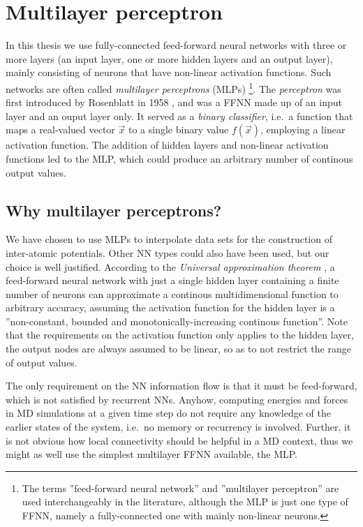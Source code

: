 \documentclass[twoside,english]{uiofysmaster}
\begin{document}
\section{Multilayer perceptron} \label{sec:MLP}
In this thesis we use fully-connected feed-forward neural networks with three
or more layers (an input layer, one or more hidden layers and an output layer), mainly
consisting of neurons that have non-linear activation functions.
Such networks are often called \textit{multilayer perceptrons} (MLPs)%
\footnote{The terms ''feed-forward neural network'' and ''multilayer perceptron'' are used interchangeably in the 
literature, although the MLP is just one type of FFNN, namely a fully-connected one with mainly non-linear neurons.}.
The \textit{perceptron} was first introduced by Rosenblatt in 1958 \cite{Rosenblatt58}, and was a FFNN made up of an input layer
and an ouput layer only. It served as a \textit{binary classifier}, i.e.\ a function that maps a real-valued vector $\vec{x}$ 
to a single binary value $f(\vec{x})$, employing a linear activation function. The addition of hidden layers and 
non-linear activation functions led to the MLP, which could produce an arbitrary number of continous output values. 

\subsection{Why multilayer perceptrons?} \label{sec:whyMLP}
We have chosen to use MLPs to interpolate data sets for the construction of inter-atomic potentials. 
Other NN types could also have been used, but our choice is well justified. According to the
\textit{Universal approximation theorem} \cite{Hornik89}, a feed-forward neural network with just a single hidden layer containing 
a finite number of neurons can approximate a continous multidimensional function to arbitrary accuracy, 
assuming the activation function for the hidden layer is a ''non-constant, bounded and monotonically-increasing continous function''.
Note that the requirements on the activation function only applies to the hidden layer, the output nodes are always
assumed to be linear, so as to not restrict the range of output values. 

The only requirement on the NN information flow is that it must be feed-forward, which is not satisfied by recurrent NNs.
Anyhow, computing energies and forces in MD simulations at a given time step do not require any knowledge of 
the earlier states of the system, i.e.\ no memory or recurrency is involved.
Further, it is not obvious how local connectivity should be helpful in a MD context, thus
we might as well use the simplest multilayer FFNN available, the MLP. 
\end{document}
